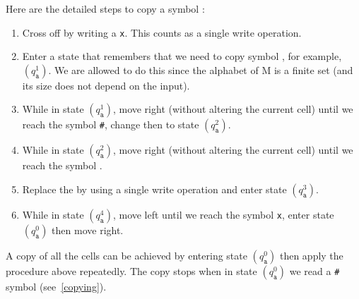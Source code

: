 \documentclass{article}
\newcommand\obullet[1]{\ThisStyle{\ensurestackMath{%
  \stackon[1pt]{\SavedStyle#1}{\SavedStyle\kern.6\LMpt\bullet}}}}
\newcommand{\0}{\texttt{\textvisiblespace}}
\newcommand{\°}{\obullet{\0}}
\newcommand{\s}{\texttt{a}}
\newcommand{\X}{\texttt{x}}
\newcommand{\e}{\texttt{\#}}
\begin{document}
Here are the detailed steps to copy a symbol \obullet{\s}:
\begin{enumerate}
	\item Cross off \obullet{\s} by writing a \X{}. This
		counts as a single write operation.
	\item Enter a state that remembers that we need to copy symbol
		\obullet{\s}, for example, \((q_{\texttt{a}}^1)\). We are allowed
		to do this since the alphabet of M is a finite set (and its size does not
		depend on the input).
	\item While in state \((q_{\texttt{a}}^1)\), move right (without
		altering the current cell) until we reach
		the symbol \e, change then to state
		\((q_{\texttt{a}}^2)\).
	\item While in state \((q_{\texttt{a}}^2)\), move right (without
	altering the current cell) until we reach the symbol \0{}.
\item Replace the \0{} by \obullet{\s} using a
		single write operation and enter state \((q_{\texttt{a}}^3)\).
	\item While in state \((q_{\texttt{a}}^4)\), move left until we reach
		the symbol \X{}, enter state \((q_{\texttt{a}}^0)\)
		then move right.
\end{enumerate}
A copy of all the cells can be achieved by entering state \((q_{\texttt{a}}^0)\)
then apply the procedure above repeatedly.
The copy stops when in state \((q_{\texttt{a}}^0)\) we read a \e{}
symbol (see~\ref{copying}).
\end{document}

